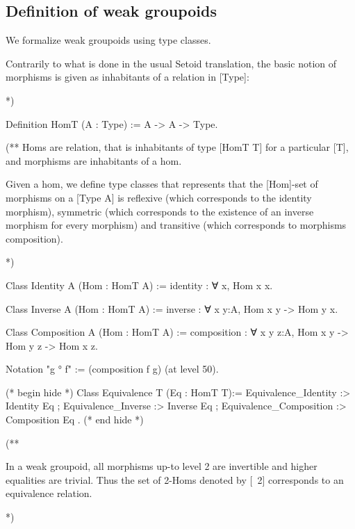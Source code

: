 \documentclass[12pt]{report}
\begin{document}

\begin{coqdoccode}
\coqdocemptyline
\coqdocemptyline
\end{coqdoccode}


\subsection{Definition of weak groupoids}


 \label{sec:w2gpds}
 We formalize weak groupoids using type classes. 
 
 Contrarily to what is done in the usual Setoid translation,
 the basic notion of morphisms is given as inhabitants of a relation in [Type]:

*)

Definition HomT (A : Type) := A -> A -> Type.

(**
  Homs are relation, that is inhabitants of type [HomT T] for a particular [T], 
  and morphisms are inhabitants of a hom.

  Given a hom, we define type classes that represents that the
  [Hom]-set of morphisms on a [Type A] is reflexive (which corresponds
  to the identity morphism), symmetric (which corresponds to the
  existence of an inverse morphism for every morphism) and transitive
  (which corresponds to morphisms composition).

*)
  
Class Identity {A} (Hom : HomT A) :=
  identity : ∀ x, Hom x x.

Class Inverse {A} (Hom : HomT A) :=
  inverse : ∀ x y:A, Hom x y -> Hom y x.

Class Composition {A} (Hom : HomT A) :=
  composition : ∀ {x y z:A}, Hom x y -> Hom y z -> Hom x z.

Notation  "g ° f" := (composition f g) (at level 50). 

(* begin hide *)
Class Equivalence {T} (Eq : HomT T):= {
  Equivalence_Identity :> Identity Eq ;
  Equivalence_Inverse :> Inverse Eq ;
  Equivalence_Composition :> Composition Eq 
}.
(* end hide *)

(**

  In a weak groupoid, all morphisms up-to level 2 are invertible and
higher equalities are trivial. Thus the set of 2-Homs denoted by [~2]
corresponds to an equivalence relation.

*)
\begin{coqdoccode}
\end{coqdoccode}
\end{document}
